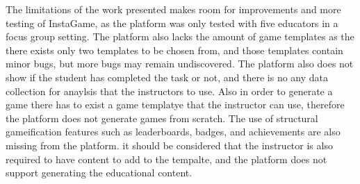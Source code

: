 The limitations of the work presented makes room for improvements and more testing of InstaGame, as the platform was only tested with five educators in a focus group setting. The platform also lacks the amount of game templates as the there exists only two templates to be chosen from, and those templates contain minor bugs, but more bugs may remain undiscovered. The platform also does not show if the student has completed the task or not, and there is no any data collection for anaylsis that the instructors to use. Also in order to generate a game there has to exist a game templatye that the instructor can use, therefore the platform does not generate games from scratch. The use of structural gameification features such as leaderboards, badges, and achievements are also missing from the platform. it should be considered that the instructor is also required to have content to add to the tempalte, and the platform does not support generating the educational content. 
